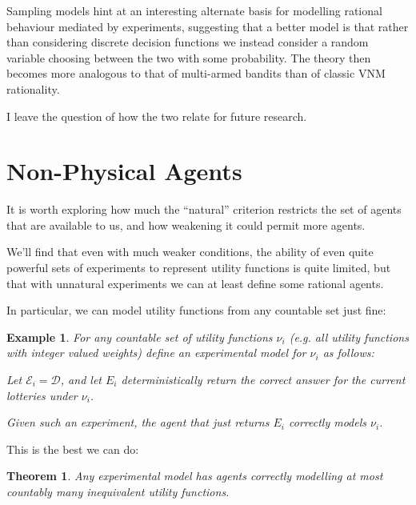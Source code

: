 \documentclass[a4paper]{book}
\newtheorem{theorem}{Theorem}
\newtheorem{example}{Example}
\begin{document}
Sampling models hint at an interesting alternate basis for modelling
rational behaviour mediated by experiments, suggesting that a better
model is that rather than considering discrete decision functions
we instead consider a random variable choosing between the two with
some probability. The theory then becomes more analogous to that
of multi-armed bandits than of classic VNM rationality.

I leave the question of how the two relate for future research.

\section{Non-Physical Agents}
It is worth exploring how much the ``natural'' criterion restricts the
set of agents that are available to us, and how weakening it could
permit more agents.

We'll find that even with much weaker conditions,  the ability of even
quite powerful sets of experiments to represent utility functions is quite limited,
but that with unnatural experiments we can at least define some rational agents.

In particular, we can model utility functions from any countable set just fine:

\begin{example}
For any countable set of utility functions \(\nu_i\) (e.g. all utility functions
with integer valued weights) define an experimental model for $\nu_i$
as follows:

Let \(\mathcal{E}_i = \mathcal{D}\), and let $E_i$ deterministically return the
correct answer for the current lotteries under $\nu_i$.

Given such an experiment, the agent that just returns $E_i$ correctly models $\nu_i$.
\end{example}

This is the best we can do:

\begin{theorem}
Any experimental model has agents correctly modelling at most countably
many inequivalent utility functions. 
\end{theorem}
\end{document}
